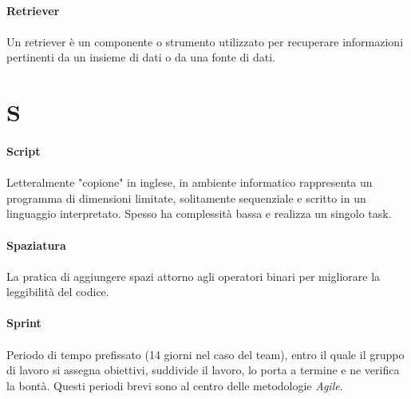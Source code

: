 \documentclass[10pt, a4paper]{article}
\begin{document}
\vspace{2em}
\paragraph{Retriever}\noindent\hrulefill
\paragraph{}Un retriever è un componente o strumento utilizzato per recuperare informazioni pertinenti da un insieme di dati o da una fonte di dati.



\newpage
\section{S}

\vspace{2em}
\paragraph{Script}\noindent\hrulefill
\paragraph{}Letteralmente "copione" in inglese, in ambiente informatico rappresenta un programma di dimensioni limitate, solitamente sequenziale e scritto in un linguaggio interpretato. Spesso ha complessità bassa e realizza un singolo task.





\vspace{2em}
\paragraph{Spaziatura}\noindent\hrulefill
\paragraph{}La pratica di aggiungere spazi attorno agli operatori binari per migliorare la leggibilità del codice.


\vspace{2em}
\paragraph{Sprint}\noindent\hrulefill
\paragraph{}Periodo di tempo prefissato (14 giorni nel caso del team), entro il quale il gruppo di lavoro si assegna obiettivi, suddivide il lavoro, lo porta a termine e ne verifica la bontà. Questi periodi brevi sono al centro delle metodologie \textit{Agile\pg}.
\end{document}
